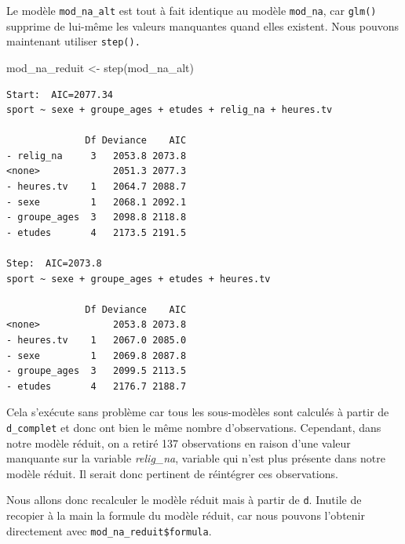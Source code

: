\documentclass[
  letterpaper,
  DIV=11,
  numbers=noendperiod,
  oneside]{scrreprt}
\newenvironment{Shaded}{\begin{snugshade}}{\end{snugshade}}
\newcommand{\AttributeTok}[1]{\textcolor[rgb]{0.40,0.45,0.13}{#1}}
\newcommand{\FunctionTok}[1]{\textcolor[rgb]{0.28,0.35,0.67}{#1}}
\newcommand{\NormalTok}[1]{\textcolor[rgb]{0.00,0.23,0.31}{#1}}
\newcommand{\OtherTok}[1]{\textcolor[rgb]{0.00,0.23,0.31}{#1}}
\newcommand{\SpecialCharTok}[1]{\textcolor[rgb]{0.37,0.37,0.37}{#1}}
\begin{document}
\begin{tcolorbox}
Le modèle \texttt{mod\_na\_alt} est tout à fait identique au modèle
\texttt{mod\_na}, car \texttt{glm()} supprime de lui-même les valeurs
manquantes quand elles existent. Nous pouvons maintenant utiliser
\texttt{step().}

\begin{Shaded}
\begin{Highlighting}[]
\NormalTok{mod\_na\_reduit }\OtherTok{\textless{}{-}} \FunctionTok{step}\NormalTok{(mod\_na\_alt)}
\end{Highlighting}
\end{Shaded}

\begin{verbatim}
Start:  AIC=2077.34
sport ~ sexe + groupe_ages + etudes + relig_na + heures.tv

              Df Deviance    AIC
- relig_na     3   2053.8 2073.8
<none>             2051.3 2077.3
- heures.tv    1   2064.7 2088.7
- sexe         1   2068.1 2092.1
- groupe_ages  3   2098.8 2118.8
- etudes       4   2173.5 2191.5

Step:  AIC=2073.8
sport ~ sexe + groupe_ages + etudes + heures.tv

              Df Deviance    AIC
<none>             2053.8 2073.8
- heures.tv    1   2067.0 2085.0
- sexe         1   2069.8 2087.8
- groupe_ages  3   2099.5 2113.5
- etudes       4   2176.7 2188.7
\end{verbatim}

Cela s'exécute sans problème car tous les sous-modèles sont calculés à
partir de \texttt{d\_complet} et donc ont bien le même nombre
d'observations. Cependant, dans notre modèle réduit, on a retiré 137
observations en raison d'une valeur manquante sur la variable
\emph{relig\_na}, variable qui n'est plus présente dans notre modèle
réduit. Il serait donc pertinent de réintégrer ces observations.

Nous allons donc recalculer le modèle réduit mais à partir de
\texttt{d}. Inutile de recopier à la main la formule du modèle réduit,
car nous pouvons l'obtenir directement avec
\texttt{mod\_na\_reduit\$formula}.

\begin{Shaded}
\end{Shaded}


\end{tcolorbox}
\end{document}
